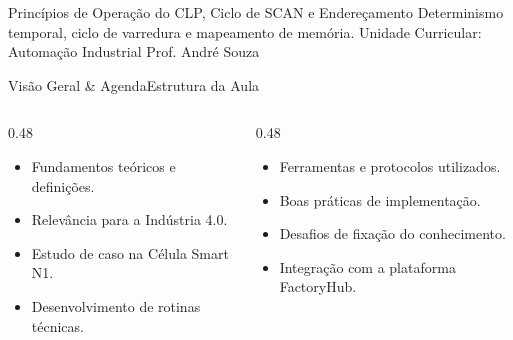 
\senaicover
  {Princípios de Operação do CLP, Ciclo de SCAN e Endereçamento}
  {Determinismo temporal, ciclo de varredura e mapeamento de memória.}
  {Unidade Curricular: Automação Industrial}
  {Prof. André Souza}

\begin{senaiframe}{Visão Geral \& Agenda}{Estrutura da Aula}
  \begin{columns}[t]
    \begin{column}{0.48\textwidth}
      \begin{tcolorbox}[senaibluecard, title={1. Conceitos Chave}]
        \begin{itemize}
          \item Fundamentos teóricos e definições.
          \item Relevância para a Indústria 4.0.
        \end{itemize}
      \end{tcolorbox}
      \vspace{4pt}
      \begin{tcolorbox}[senaiambercard, title={3. Aplicação Prática}]
        \begin{itemize}
          \item Estudo de caso na Célula Smart N1.
          \item Desenvolvimento de rotinas técnicas.
        \end{itemize}
      \end{tcolorbox}
    \end{column}
    \begin{column}{0.48\textwidth}
      \begin{tcolorbox}[senairedcard, title={2. Detalhamento Técnico}]
        \begin{itemize}
          \item Ferramentas e protocolos utilizados.
          \item Boas práticas de implementação.
        \end{itemize}
      \end{tcolorbox}
      \vspace{4pt}
      \begin{tcolorbox}[senaigreencard, title={4. Exercícios \& Avaliação}]
        \begin{itemize}
          \item Desafios de fixação do conhecimento.
          \item Integração com a plataforma FactoryHub.
        \end{itemize}
      \end{tcolorbox}
    \end{column}
  \end{columns}
\end{senaiframe}

